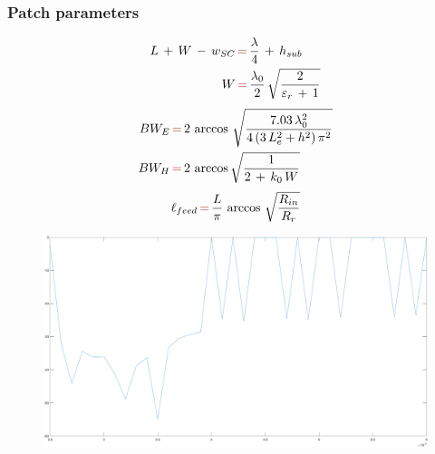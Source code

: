 \documentclass[12pt,a4paper]{article}
\begin{document}
{\subsubsection*{\selectfont\color{Turquoise}Patch parameters}
\begin{equation}\begin{aligned}L\,+\,W\,-\,w_{SC}\,&{\color{Mahogany}=}\,\frac{\lambda}{4}\,+\,h_{sub}\\
W\,&{\color{Mahogany}=}\,\frac{\lambda_0}{2}\,\sqrt{\frac{2}{\varepsilon_r\,+\,1}}\\
\end{aligned}
\end{equation}
\begin{equation}
\begin{aligned}
BW_E\,&{\color{Mahogany}=}\,2\,\arccos\,\sqrt{\frac{7.03\,\lambda_0^2}{4\,(3\,L_e^2+h^2)\,\pi^2}}\\
BW_H\,&{\color{Mahogany}=}\,2\,\arccos\sqrt{\frac{1}{2\,+\,k_0\,W}}\\
\end{aligned}
\end{equation}
\begin{equation}
\ell_{feed}\,{\color{Mahogany}=}\,\frac{L}{\pi}\,\arccos\,\sqrt{\frac{R_{in}}{R_r}}
\end{equation}
\begin{center}
	\begin{figure}[h]
		\includegraphics[scale=0.3]{mesh_levels.png}
	\end{figure}
\end{center}
\begin{center}

\end{center}}
\end{document}
